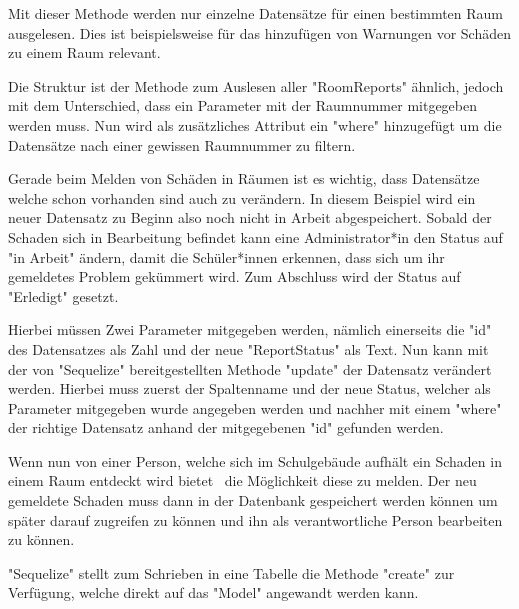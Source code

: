 

Mit dieser Methode werden nur einzelne Datensätze für einen bestimmten Raum ausgelesen. Dies ist beispielsweise für das hinzufügen von Warnungen vor Schäden zu einem Raum relevant. 

Die Struktur ist der Methode zum Auslesen aller "RoomReports" ähnlich, jedoch mit dem Unterschied, dass ein Parameter mit der Raumnummer mitgegeben werden muss. Nun wird als zusätzliches Attribut ein "where" hinzugefügt um die Datensätze nach einer gewissen Raumnummer zu filtern.



Gerade beim Melden von Schäden in Räumen ist es wichtig, dass Datensätze welche schon vorhanden sind auch zu verändern. In diesem Beispiel wird ein neuer Datensatz zu Beginn also noch nicht in Arbeit abgespeichert. Sobald der Schaden sich in Bearbeitung befindet kann eine Administrator*in den Status auf "in Arbeit" ändern, damit die Schüler*innen erkennen, dass sich um ihr gemeldetes Problem gekümmert wird. Zum Abschluss wird der Status auf "Erledigt" gesetzt.

Hierbei müssen Zwei Parameter mitgegeben werden, nämlich einerseits die "id" des Datensatzes als Zahl und der neue "ReportStatus" als Text. Nun kann mit der von "Sequelize" bereitgestellten Methode "update" der Datensatz verändert werden. Hierbei muss zuerst der Spaltenname und der neue Status, welcher als Parameter mitgegeben wurde angegeben werden und nachher mit einem "where" der richtige Datensatz anhand der mitgegebenen "id" gefunden werden.



Wenn nun von einer Person, welche sich im Schulgebäude aufhält ein Schaden in einem Raum entdeckt wird bietet \ZELIA\ die Möglichkeit diese zu melden. Der neu gemeldete Schaden muss dann in der Datenbank gespeichert werden können um später darauf zugreifen zu können und ihn als verantwortliche Person bearbeiten zu können.

"Sequelize" stellt zum Schrieben in eine Tabelle die Methode "create" zur Verfügung, welche direkt auf das "Model" angewandt werden kann.

